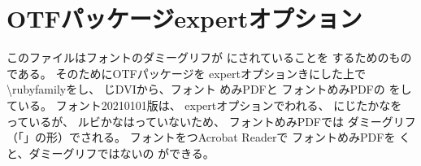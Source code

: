\documentclass{jsarticle}
\begin{document}
\section{OTFパッケージexpertオプション}

このファイルはフォントのダミーグリフが
にされていることを
するためのものである。
そのためにOTFパッケージを
expertオプションきにした上で
\textbackslash rubyfamilyをし、
じDVIから、フォント
めみPDFと
フォントめみPDFの
をしている。
フォント20210101版は、
expertオプションでわれる、
にじたかなを
っているが、
ルビかなはっていないため、
フォントめみPDFでは
ダミーグリフ（「」の形）でされる。
フォントをつAcrobat Readerで
フォントめみPDFを
くと、ダミーグリフではないの
ができる。
\end{document}
